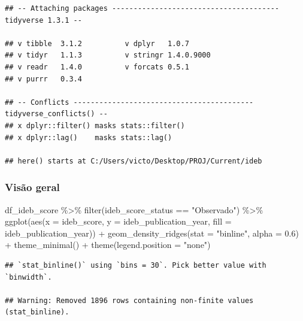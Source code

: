 \documentclass[
]{article}
\newenvironment{Shaded}{\begin{snugshade}}{\end{snugshade}}
\newcommand{\AttributeTok}[1]{\textcolor[rgb]{0.77,0.63,0.00}{#1}}
\newcommand{\FloatTok}[1]{\textcolor[rgb]{0.00,0.00,0.81}{#1}}
\newcommand{\FunctionTok}[1]{\textcolor[rgb]{0.00,0.00,0.00}{#1}}
\newcommand{\NormalTok}[1]{#1}
\newcommand{\SpecialCharTok}[1]{\textcolor[rgb]{0.00,0.00,0.00}{#1}}
\newcommand{\StringTok}[1]{\textcolor[rgb]{0.31,0.60,0.02}{#1}}
\begin{document}
\begin{verbatim}
## -- Attaching packages --------------------------------------- tidyverse 1.3.1 --

## v tibble  3.1.2          v dplyr   1.0.7     
## v tidyr   1.1.3          v stringr 1.4.0.9000
## v readr   1.4.0          v forcats 0.5.1     
## v purrr   0.3.4

## -- Conflicts ------------------------------------------ tidyverse_conflicts() --
## x dplyr::filter() masks stats::filter()
## x dplyr::lag()    masks stats::lag()

## here() starts at C:/Users/victo/Desktop/PROJ/Current/ideb
\end{verbatim}

\hypertarget{visuxe3o-geral}{%
\subsubsection{Visão geral}\label{visuxe3o-geral}}

\begin{Shaded}
\begin{Highlighting}[]
\NormalTok{df\_ideb\_score }\SpecialCharTok{\%\textgreater{}\%}
  \FunctionTok{filter}\NormalTok{(ideb\_score\_status }\SpecialCharTok{==} \StringTok{"Observado"}\NormalTok{) }\SpecialCharTok{\%\textgreater{}\%}
  \FunctionTok{ggplot}\NormalTok{(}\FunctionTok{aes}\NormalTok{(}\AttributeTok{x =}\NormalTok{ ideb\_score, }
             \AttributeTok{y =}\NormalTok{ ideb\_publication\_year, }
             \AttributeTok{fill =}\NormalTok{ ideb\_publication\_year)) }\SpecialCharTok{+}
  \FunctionTok{geom\_density\_ridges}\NormalTok{(}\AttributeTok{stat =} \StringTok{"binline"}\NormalTok{, }\AttributeTok{alpha =} \FloatTok{0.6}\NormalTok{) }\SpecialCharTok{+}
  \FunctionTok{theme\_minimal}\NormalTok{() }\SpecialCharTok{+}
  \FunctionTok{theme}\NormalTok{(}\AttributeTok{legend.position =} \StringTok{"none"}\NormalTok{)}
\end{Highlighting}
\end{Shaded}

\begin{verbatim}
## `stat_binline()` using `bins = 30`. Pick better value with `binwidth`.

## Warning: Removed 1896 rows containing non-finite values (stat_binline).
\end{verbatim}
\end{document}
